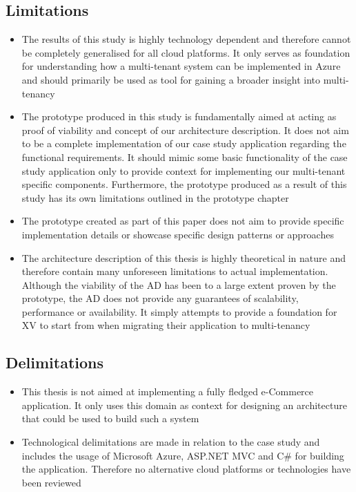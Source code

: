 \subsection{Limitations}
\begin{itemize}
\item The results of this study is highly technology dependent and therefore cannot be completely generalised for all cloud platforms. It only serves as foundation for understanding how a multi-tenant system can be implemented in Azure and should primarily be used as tool for gaining a broader insight into multi-tenancy
\item The prototype produced in this study is fundamentally aimed at acting as proof of viability and concept of our architecture description. It does not aim to be a complete implementation of our case study application regarding the functional requirements. It should mimic some basic functionality of the case study application only to provide context for implementing our multi-tenant specific components. Furthermore, the prototype produced as a result of this study has its own limitations outlined in the prototype chapter
\item The prototype created as part of this paper does not aim to provide specific implementation details or showcase specific design patterns or approaches
\item The architecture description of this thesis is highly theoretical in nature and therefore contain many unforeseen limitations to actual implementation. Although the viability of the AD has been to a large extent proven by the prototype, the AD does not provide any guarantees of scalability, performance or availability. It simply attempts to provide a foundation for XV to start from when migrating their application to multi-tenancy
\end{itemize}

\subsection{Delimitations}
\begin{itemize}
\item This thesis is not aimed at implementing a fully fledged e-Commerce application. It only uses this domain as context for designing an architecture that could be used to build such a system
\item Technological delimitations are made in relation to the case study and includes the usage of Microsoft Azure, ASP.NET  MVC and C\# for building the application. Therefore no alternative cloud platforms or technologies have been reviewed 
\end{itemize}
\vfill


